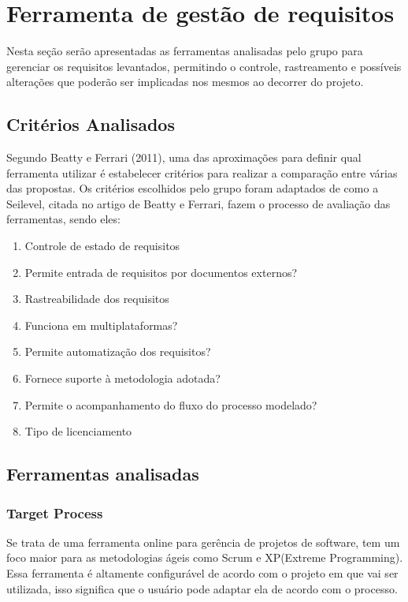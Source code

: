 \chapter{Ferramenta de gestão de requisitos}

Nesta seção serão apresentadas as ferramentas analisadas pelo grupo para gerenciar os requisitos levantados, permitindo o controle, rastreamento e possíveis alterações que poderão ser implicadas nos mesmos ao decorrer do projeto.

\section{Critérios Analisados}
	Segundo Beatty e Ferrari (2011), uma das aproximações para definir qual ferramenta utilizar é estabelecer critérios para realizar a comparação entre várias das propostas.
	Os critérios escolhidos pelo grupo foram adaptados de como a Seilevel, citada no artigo de Beatty e Ferrari, fazem o processo de avaliação das ferramentas, sendo eles:
	\begin{enumerate}
	\item Controle de estado de requisitos
	\item Permite entrada de requisitos por documentos externos?
	\item Rastreabilidade dos requisitos
	\item Funciona em multiplataformas?
	\item Permite automatização dos requisitos?
	\item Fornece suporte à metodologia adotada?
	\item Permite o acompanhamento do fluxo do processo modelado?
	\item Tipo de licenciamento
	\end{enumerate}
\section{Ferramentas analisadas}

\subsection{Target Process}
Se trata de uma ferramenta online para gerência de projetos de software, tem um foco maior para as metodologias ágeis como Scrum e XP(Extreme Programming). Essa ferramenta é altamente configurável de acordo com o projeto em que vai ser utilizada, isso significa que o usuário pode adaptar ela de acordo com o processo.

